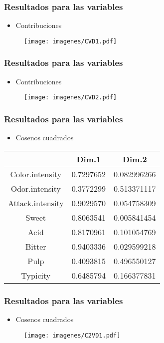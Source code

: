 \documentclass[12pt]{beamer}
\begin{document}
\begin{frame}
\frametitle{Resultados para las variables}
\begin{itemize}
\item Contribuciones
\end{itemize}
\begin{figure}[h]
  \centering
  \texttt{[image: imagenes/CVD1.pdf]}
\end{figure}
\end{frame}

\begin{frame}
\frametitle{Resultados para las variables}
\begin{itemize}
\item Contribuciones
\end{itemize}
\begin{figure}[h]
  \centering
  \texttt{[image: imagenes/CVD2.pdf]}
\end{figure}
\end{frame}

\begin{frame}
\frametitle{Resultados para las variables}
\begin{itemize}
\item Cosenos cuadrados
\end{itemize}
\begin{center}
\begin{tabular}{|c|c|c|}
\hline
 & Dim.1  &     Dim.2 \\
\hline
Color.intensity & 0.7297652 &0.082996266 \\
Odor.intensity  & 0.3772299 &0.513371117\\
Attack.intensity& 0.9029570 &0.054758309\\
Sweet           & 0.8063541 &0.005841454\\
Acid            & 0.8170961 &0.101054769\\
Bitter          & 0.9403336 &0.029599218\\
Pulp            & 0.4093815 &0.496550127\\
Typicity        & 0.6485794 &0.166377831\\
\hline
\end{tabular}
\end{center}
\end{frame}

\begin{frame}
\frametitle{Resultados para las variables}
\begin{itemize}
\item Cosenos cuadrados
\end{itemize}
\begin{figure}[h]
  \centering
  \texttt{[image: imagenes/C2VD1.pdf]}
\end{figure}
\end{frame}
\end{document}
